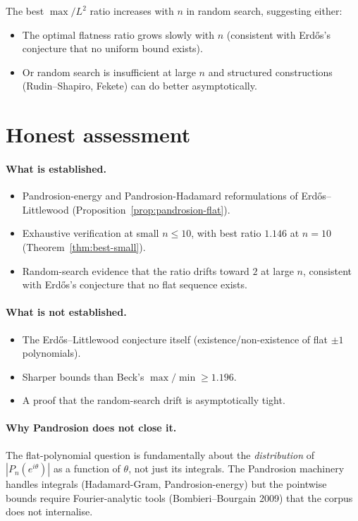 \documentclass[11pt,a4paper]{article}
\begin{document}
The best $\max/L^2$ ratio increases with $n$ in random search, suggesting
either:
\begin{itemize}
\item The optimal flatness ratio grows slowly with $n$ (consistent with
Erd\H{o}s's conjecture that no uniform bound exists).
\item Or random search is insufficient at large $n$ and structured
constructions (Rudin--Shapiro, Fekete) can do better asymptotically.
\end{itemize}

\section{Honest assessment}\label{sec:assessment}

\paragraph{What is established.}
\begin{itemize}
\item Pandrosion-energy and Pandrosion-Hadamard reformulations of
Erd\H{o}s--Littlewood (Proposition~\ref{prop:pandrosion-flat}).
\item Exhaustive verification at small $n \le 10$, with best ratio $1.146$
at $n = 10$ (Theorem~\ref{thm:best-small}).
\item Random-search evidence that the ratio drifts toward $2$ at large $n$,
consistent with Erd\H{o}s's conjecture that no flat sequence exists.
\end{itemize}

\paragraph{What is not established.}
\begin{itemize}
\item The Erd\H{o}s--Littlewood conjecture itself (existence/non-existence
of flat $\pm 1$ polynomials).
\item Sharper bounds than Beck's $\max/\min \ge 1.196$.
\item A proof that the random-search drift is asymptotically tight.
\end{itemize}

\paragraph{Why Pandrosion does not close it.}
The flat-polynomial question is fundamentally about the \emph{distribution}
of $|P_n(e^{i\theta})|$ as a function of $\theta$, not just its integrals.
The Pandrosion machinery handles integrals (Hadamard-Gram, Pandrosion-energy)
but the pointwise bounds require Fourier-analytic tools (Bombieri--Bourgain
2009) that the corpus does not internalise.
\end{document}
